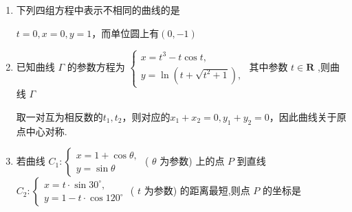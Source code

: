 \begin{enumerate}
    \item 下列四组方程中表示不相同的曲线的是
    \begin{jieda}
        $t = 0, x = 0, y = 1$，而单位圆上有$(0, -1)$
    \end{jieda}
    \item 已知曲线 $\Gamma$ 的参数方程为 $\left\{  \begin{array}{l} x = {t}^{3} - t\cos t, \\  y = \ln \left( {t + \sqrt{{t}^{2} + 1}}\right) , \end{array}\right.$ 其中参数 $t \in  \mathbf{R}$ ,则曲线 $\Gamma$
    \begin{jieda}
        取一对互为相反数的$t_1, t_2$，则对应的$x_1+x_2 = 0, y_1+y_2 = 0$，因此曲线关于原点中心对称.
    \end{jieda}
    \item 若曲线 ${C}_{1} : \left\{  \begin{array}{l} x = 1 + \cos \theta , \\  y = \sin \theta  \end{array}\right.$ ( $\theta$ 为参数) 上的点 $P$ 到直线 ${C}_{2} : \left\{  \begin{array}{l} x = t \cdot  \sin {30}^{ \circ  }, \\  y = 1 - t \cdot  \cos {120}^{ \circ  } \end{array}\right.$ ( $t$ 为参数) 的距离最短,则点 $P$ 的坐标是

\end{enumerate}
